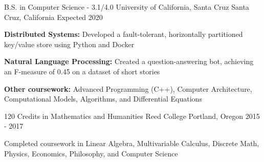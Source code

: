 

\begin{cventries}

  \cventry
    {B.S. in Computer Science - 3.1/4.0} %
    {University of California, Santa Cruz}
    {Santa Cruz, California} %
    {Expected 2020} %
    {
      \begin{cvitems} %
      \item {\textbf{Distributed Systems:} Developed a fault-tolerant,
        horizontally partitioned key/value store using Python and Docker}
        \item {\textbf{Natural Language Processing:} Created a question-answering bot,
          achieving an F-measure of 0.45 on a dataset of short stories}
        \item {\textbf{Other coursework:} Advanced Programming (C++), Computer
          Architecture, Computational Models, Algorithms, and Differential
          Equations}
      \end{cvitems}
    }

  \cventry
    {120 Credits in Mathematics and Humanities} %
    {Reed College}
    {Portland, Oregon} %
    {2015 - 2017} %
    {
      \begin{cvitems} %
      \item {Completed coursework in Linear Algebra, Multivariable Calculus,
        Discrete Math, Physics, Economics, Philosophy, and Computer Science}
      \end{cvitems}
    }
\end{cventries}
